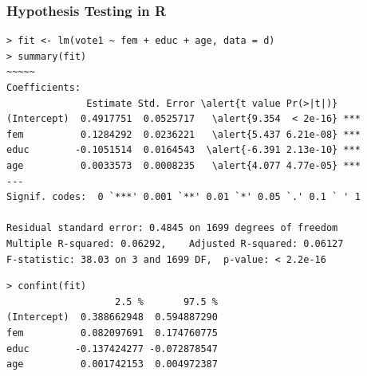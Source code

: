 \documentclass[xcolor=svgnames,9pt,english,aspectratio=169,t]{beamer}
\begin{document}
\begin{frame}[fragile]
\frametitle{Hypothesis Testing in R}

\begin{Verbatim}[fontsize=\footnotesize, frame=single, label=R Code, commandchars=\\\{\}]
> fit <- lm(vote1 ~ fem + educ + age, data = d)
> summary(fit)
~~~~~
Coefficients:
              Estimate Std. Error \alert{t value Pr(>|t|)}
(Intercept)  0.4917751  0.0525717   \alert{9.354  < 2e-16} ***
fem          0.1284292  0.0236221   \alert{5.437 6.21e-08} ***
educ        -0.1051514  0.0164543  \alert{-6.391 2.13e-10} ***
age          0.0033573  0.0008235   \alert{4.077 4.77e-05} ***
---
Signif. codes:  0 `***' 0.001 `**' 0.01 `*' 0.05 `.' 0.1 ` ' 1

Residual standard error: 0.4845 on 1699 degrees of freedom
Multiple R-squared: 0.06292,	Adjusted R-squared: 0.06127
F-statistic: 38.03 on 3 and 1699 DF,  p-value: < 2.2e-16
\end{Verbatim}

\medskip

\begin{Verbatim}[fontsize=\footnotesize, frame=single, label=R Code, commandchars=\\\{\}]
> confint(fit)
                   2.5 %       97.5 %
(Intercept)  0.388662948  0.594887290
fem          0.082097691  0.174760775
educ        -0.137424277 -0.072878547
age          0.001742153  0.004972387
\end{Verbatim}

\end{frame}




\end{document}
